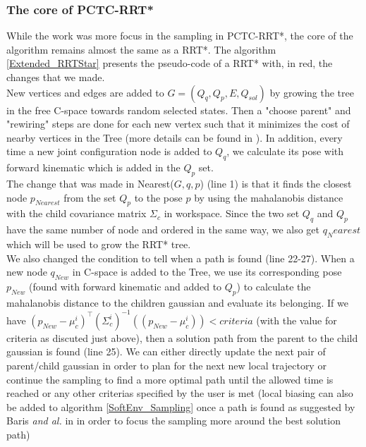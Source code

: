 \documentclass[letterpaper, 10 pt, conference]{ieeeconf}  %
\newcommand{\trsp}{{\!\scriptscriptstyle\top}}
\begin{document}
\subsubsection{The core of PCTC-RRT*}\leavevmode\par \label{coreRRTstarChapter}
While the work was more focus in the sampling in PCTC-RRT*, the core of the algorithm remains almost the same as a RRT*. The algorithm \ref{Extended_RRTStar} presents the pseudo-code of a RRT* with, in red, the changes that we made.\\
New vertices and edges are added to $G=(Q_q,Q_p,E,Q_{sol})$ by growing the tree in the free C-space towards random selected states. Then a "choose parent" and "rewiring" steps are done for each new vertex such that it minimizes the cost of nearby vertices in the Tree (more details can be found in \cite{KaramanRRTStar} ). In addition, every time a new joint configuration node is added to $Q_q$, we calculate its pose with forward kinematic which is added in the $Q_p$ set. \\
 The change that was made in {\selectfont Nearest($G,q,p$)} (line 1) is that it finds the closest node  $p_{Nearest}$ from the set $Q_p$ to the pose $p$ by using the mahalanobis distance with the child covariance matrix $\Sigma_c$ in workspace. Since the two set $Q_q$ and $Q_p$ have the same number of node and ordered in the same way, we also get $q_Nearest$ which will be used to grow the RRT* tree.\\
 We also changed the condition to tell when a path is found (line 22-27). When a new node $q_{New}$ in C-space is added to the Tree, we use its corresponding pose $p_{New}$ (found with forward kinematic and added to $Q_p$) to calculate the mahalanobis distance to the children gaussian and evaluate its belonging. If we have $(p_{New}-\mu_{c}^i)^{\trsp}(\Sigma_{c}^i)^{-1} ((p_{New}-\mu_{c}^i)) < criteria$ (with the value for criteria as discuted just above), then a solution path from the parent to the child gaussian  is found (line 25). We can either directly update the next pair of parent/child gaussian in order to plan for the next new local trajectory or continue the sampling to find a more optimal path until the allowed time is reached or any other criterias specified by the user is met (local biasing can also be added to algorithm \ref{SoftEnv_Sampling} once a path is found as suggested by Baris \textit{and al.} in \cite{BarisRRT} in order to focus the sampling more around the best solution path)  \\
 
\end{document}
